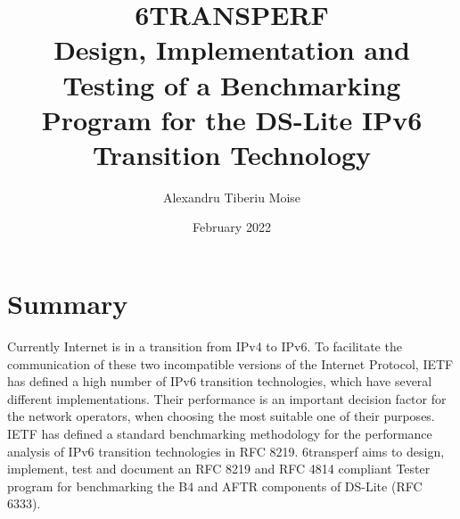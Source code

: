\documentclass[a4paper,12p]{article}
\begin{document}
\begin{titlepage}
\title{6TRANSPERF\\
\normalsize Design, Implementation and Testing of a Benchmarking Program for the DS-Lite IPv6 Transition Technology}
\author{Alexandru Tiberiu Moise}
\date{February 2022}
\end{titlepage}
\maketitle

\section{Summary}
Currently Internet is in a transition from IPv4 to IPv6. To facilitate the communication of these two incompatible versions of the Internet Protocol, IETF has defined a high number of IPv6 transition technologies, which have several different implementations. Their performance is an important decision factor for the network operators, when choosing the most suitable one of their purposes. 
IETF has defined a standard benchmarking methodology for the performance analysis of IPv6 transition technologies in RFC 8219. 6transperf aims to design, implement, test and document an RFC 8219 and RFC 4814 compliant Tester program for benchmarking the B4 and AFTR components of DS-Lite (RFC 6333).
\end{document}

